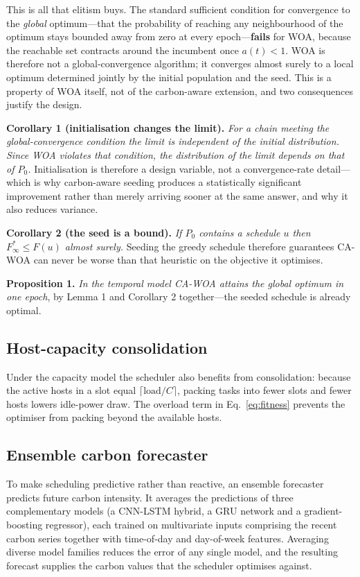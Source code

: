 \documentclass[12pt,a4paper]{article}
\begin{document}
\vspace{2pt}\noindent This is all that elitism buys. The standard sufficient condition for convergence to the
\emph{global} optimum---that the probability of reaching any neighbourhood of the optimum stays bounded away
from zero at every epoch---\textbf{fails} for WOA, because the reachable set contracts around the incumbent
once $a(t)<1$. WOA is therefore not a global-convergence algorithm; it converges almost surely to a local
optimum determined jointly by the initial population and the seed. This is a property of WOA itself, not of
the carbon-aware extension, and two consequences justify the design.

\vspace{2pt}\noindent\textbf{Corollary 1 (initialisation changes the limit).} \emph{For a chain meeting the
global-convergence condition the limit is independent of the initial distribution. Since WOA violates that
condition, the distribution of the limit depends on that of $P_0$.} Initialisation is therefore a design
variable, not a convergence-rate detail---which is why carbon-aware seeding produces a statistically
significant improvement rather than merely arriving sooner at the same answer, and why it also reduces
variance.

\vspace{2pt}\noindent\textbf{Corollary 2 (the seed is a bound).} \emph{If $P_0$ contains a schedule $u$ then
$F^{*}_\infty\le F(u)$ almost surely.} Seeding the greedy schedule therefore guarantees CA-WOA can never be
worse than that heuristic on the objective it optimises.

\vspace{2pt}\noindent\textbf{Proposition 1.} \emph{In the temporal model CA-WOA attains the global optimum in
one epoch}, by Lemma 1 and Corollary 2 together---the seeded schedule is already optimal.

\subsection{Host-capacity consolidation}
Under the capacity model the scheduler also benefits from consolidation: because the active hosts in a slot
equal $\lceil \text{load}/C \rceil$, packing tasks into fewer slots and fewer hosts lowers idle-power draw. The
overload term in Eq.~\eqref{eq:fitness} prevents the optimiser from packing beyond the available hosts.

\subsection{Ensemble carbon forecaster}
To make scheduling predictive rather than reactive, an ensemble forecaster predicts future carbon intensity. It
averages the predictions of three complementary models (a CNN-LSTM hybrid, a GRU network and a
gradient-boosting regressor), each trained on multivariate inputs comprising the recent carbon series
together with time-of-day and day-of-week features. Averaging diverse model families reduces the error of any
single model, and the resulting forecast supplies the carbon values that the scheduler optimises against.
\end{document}
